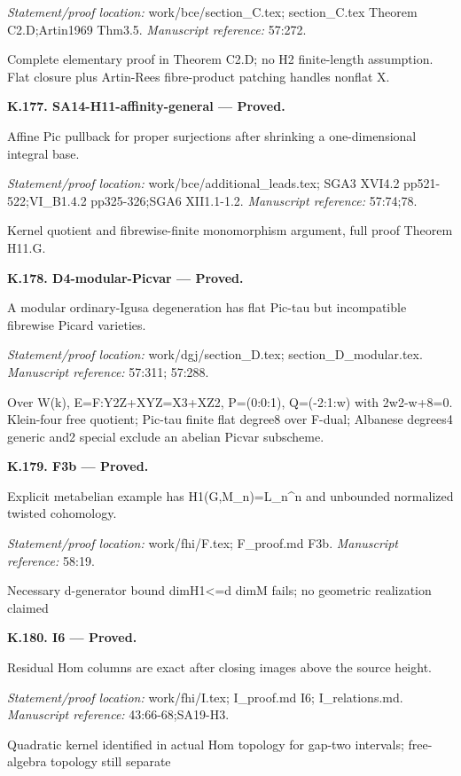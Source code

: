 \par\emph{Statement/proof location:} work/bce/section\_C.tex; section\_C.tex Theorem C2.D;Artin1969 Thm3.5.
\emph{Manuscript reference:} 57:272.
\par Complete elementary proof in Theorem C2.D; no H2 finite-length assumption. Flat closure plus Artin-Rees fibre-product patching handles nonflat X.
\par\medskip\noindent\textbf{K.177. SA14-H11-affinity-general --- Proved.}\par
Affine Pic pullback for proper surjections after shrinking a one-dimensional integral base.
\par\emph{Statement/proof location:} work/bce/additional\_leads.tex; SGA3 XVI4.2 pp521-522;VI\_B1.4.2 pp325-326;SGA6 XII1.1-1.2.
\emph{Manuscript reference:} 57:74;78.
\par Kernel quotient and fibrewise-finite monomorphism argument, full proof Theorem H11.G.
\par\medskip\noindent\textbf{K.178. D4-modular-Picvar --- Proved.}\par
A modular ordinary-Igusa degeneration has flat Pic-tau but incompatible fibrewise Picard varieties.
\par\emph{Statement/proof location:} work/dgj/section\_D.tex; section\_D\_modular.tex.
\emph{Manuscript reference:} 57:311; 57:288.
\par Over W(k), E=F:Y2Z+XYZ=X3+XZ2, P=(0:0:1), Q=(-2:1:w) with 2w2-w+8=0. Klein-four free quotient; Pic-tau finite flat degree8 over F-dual; Albanese degrees4 generic and2 special exclude an abelian Picvar subscheme.
\par\medskip\noindent\textbf{K.179. F3b --- Proved.}\par
Explicit metabelian example has H1(G,M\_n)=L\_n\textasciicircum{}n and unbounded normalized twisted cohomology.
\par\emph{Statement/proof location:} work/fhi/F.tex; F\_proof.md F3b.
\emph{Manuscript reference:} 58:19.
\par Necessary d-generator bound dimH1<=d dimM fails; no geometric realization claimed
\par\medskip\noindent\textbf{K.180. I6 --- Proved.}\par
Residual Hom columns are exact after closing images above the source height.
\par\emph{Statement/proof location:} work/fhi/I.tex; I\_proof.md I6; I\_relations.md.
\emph{Manuscript reference:} 43:66-68;SA19-H3.
\par Quadratic kernel identified in actual Hom topology for gap-two intervals; free-algebra topology still separate

